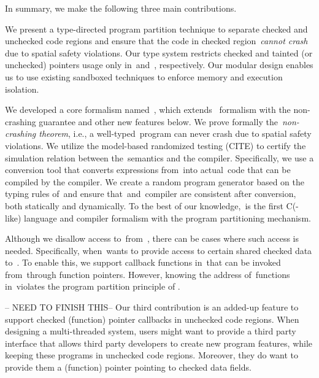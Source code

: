 In summary, we make the following three main contributions.

We present a type-directed program partition technique to separate checked and unchecked code regions and ensure that the code in checked region~\textit{cannot crash} due to spatial safety violations.
Our type system restricts checked and tainted (or unchecked) pointers usage only in~\cregion and~\ucregion, respectively.
Our modular design enables us to use existing sandboxed techniques to enforce memory and execution isolation.

%
We developed a core formalism named~\lang, which extends
\citet{li22checkedc}~\checkedc formalism with the non-crashing guarantee and other new features below.
We prove formally the~\emph{non-crashing theorem}, i.e., 
a well-typed~\lang program can never crash due to spatial safety violations.
We utilize the model-based randomized testing (CITE) to certify the simulation relation between the~\lang semantics and the compiler.
Specifically, we use a conversion tool that converts expressions from~\lang into actual~\checkedc code that can be compiled by the \checkedc compiler. We create a random program generator 
based on the typing rules of~\lang and ensure that~\lang and~\checkedc compiler are consistent after conversion, both statically and dynamically.  
To the best of our knowledge,~\lang is the first C(-like) language and compiler formalism with the program partitioning mechanism.

Although we disallow access to~\cregion from~\ucregion, there can be cases where such access is needed. Specifically, when~\cregion wants to provide access to certain shared checked data to~\ucregion.
To enable this, we support callback functions in~\cregion that can be invoked from~\ucregion through function pointers.
However, knowing the address of~\cregion functions in~\ucregion violates the program partition principle of \systemname.

-- NEED TO FINISH THIS--
Our third contribution is an added-up feature
to support checked (function) pointer callbacks in unchecked code regions.
When designing a multi-threaded system, users might want 
to provide a third party interface that allows third party developers to create new program features, while keeping these programs in unchecked code regions.
Moreover, they do want to provide them a (function) pointer pointing to checked data fields.

